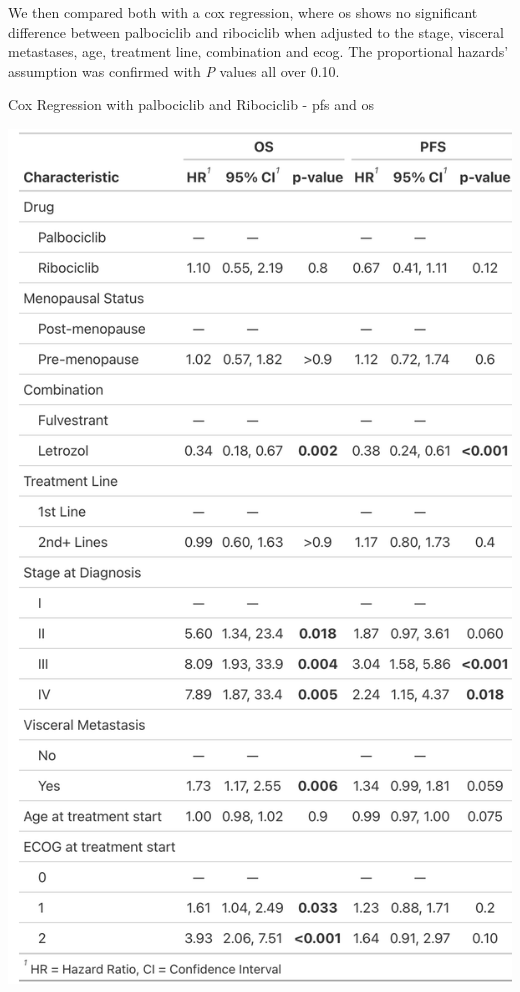 We then compared both with a cox regression, where \ac{os} shows no significant difference between palbociclib and ribociclib when adjusted to the stage, visceral metastases, age, treatment line, combination and \ac{ecog}. The proportional hazards' assumption was confirmed with \textit{P} values all over 0.10.
\begin{table}[ht]
  \centering
  \caption{Cox Regression with palbociclib and Ribociclib - \ac{pfs} and \ac{os}}\label{tab:cox} 
  \includegraphics[scale=0.20]{figures/cox_both.png}%

\end{table}

